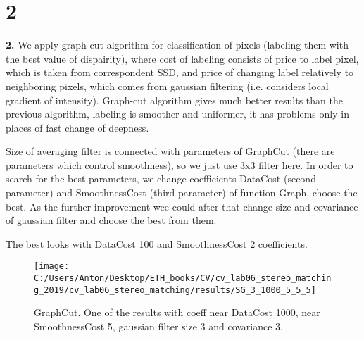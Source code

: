 \documentclass{report}
\begin{document}
\newpage
\section{2}
	\textbf{2.} We apply graph-cut algorithm for classification of pixels (labeling them with the best value of dispairity), where cost of labeling consists of price to label pixel, which is taken from correspondent SSD, and price of changing label relatively to neighboring pixels, which comes from gaussian filtering (i.e. considers local gradient of intensity). Graph-cut algorithm gives much better results than the previous algorithm, labeling is smoother and uniformer, it has problems only in places of fast change of deepness.
	
	Size of averaging filter is connected with parameters of GraphCut (there are parameters which control smoothness), so we just use 3x3 filter here. In order to search for the best parameters, we change coefficients DataCost (second parameter) and SmoothnessCost (third parameter) of function Graph, choose the best. As the further improvement wee could after that change size and covariance of gaussian filter and choose the best from them.
	
	The best looks with DataCost 100 and SmoothnessCost 2 coefficients.
	\begin{figure}[h]
		\begin{center}
			\begin{minipage}[h]{0.49\linewidth}
				\texttt{[image: C:/Users/Anton/Desktop/ETH\_books/CV/cv\_lab06\_stereo\_matching\_2019/cv\_lab06\_stereo\_matching/results/SG\_3\_1000\_5\_5\_5]}
			\end{minipage}
		\caption{GraphCut. One of the results with coeff near DataCost 1000, near SmoothnessCost 5, gaussian filter size 3 and covariance 3.}
		\end{center}
	\end{figure}
\end{document}
